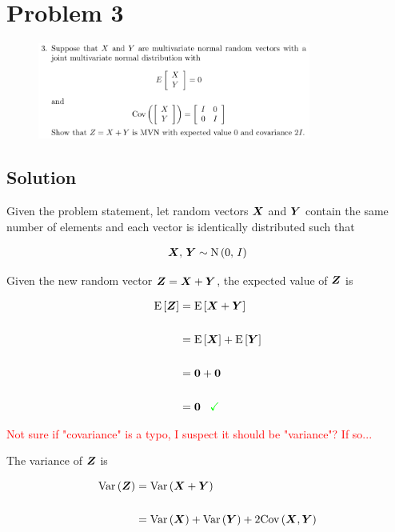 
\begingroup
\allowdisplaybreaks

\newpage
\section*{Problem 3}

\begin{figure}[h]
	\centering
	\includegraphics[width=0.8\textwidth]{./images/prob3_statement.png}
\end{figure}

\subsection*{Solution}

Given the problem statement, let random vectors $\boldsymbol{X}$ and $\boldsymbol{Y}$ contain the same number of elements and each vector is identically distributed such that

\begin{align*}
	\boldsymbol{X},\,\boldsymbol{Y} \sim \textrm{N}\left(0,\,I\right)
\end{align*}

Given the new random vector $\boldsymbol{Z} = \boldsymbol{X} + \boldsymbol{Y}$, the expected value of $\boldsymbol{Z}$ is

\begin{align*}
	\textrm{E}\left[\boldsymbol{Z}\right] &= \textrm{E}\left[\boldsymbol{X} + \boldsymbol{Y}\right] \\
	\\
	&= \textrm{E}\left[\boldsymbol{X}\right] + \textrm{E}\left[\boldsymbol{Y}\right] \\
	\\
	&= \boldsymbol{0} + \boldsymbol{0} \\
	\\
	&= \boldsymbol{0} \,\,\,\,\, \textcolor{green}{\checkmark}
\end{align*}

\textcolor{red}{Not sure if "covariance" is a typo, I suspect it should be "variance"? If so...}

The variance of $\boldsymbol{Z}$ is

\begin{align*}
	\textrm{Var}\left(\boldsymbol{Z}\right) &= \textrm{Var}\left(\boldsymbol{X} + \boldsymbol{Y}\right) \\
	\\
	&= \textrm{Var}\left(\boldsymbol{X}\right) + \textrm{Var}\left(\boldsymbol{Y}\right) + 2\textrm{Cov}\left(\boldsymbol{X},\boldsymbol{Y}\right)
\end{align*}

